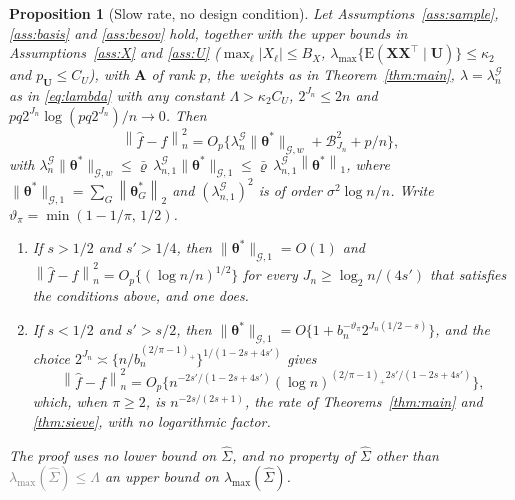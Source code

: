 \documentclass[12pt]{article} %
\newtheorem{proposition}{Proposition}
\theoremstyle{definition}
\theoremstyle{plain}
\newcommand{\E}{\mathrm{E}}
\newcommand{\T}{^{\top}}
\newcommand{\norm}[1]{\left\lVert #1 \right\rVert}
\newcommand{\normn}[1]{\left\lVert #1 \right\rVert_{n}}
\newcommand{\cv}{\ell}
\newcommand{\bX}{\mathbf{X}}
\newcommand{\bU}{\mathbf{U}}
\newcommand{\btheta}{\boldsymbol{\theta}}
\newcommand{\thetastar}{\btheta^{*}}
\newcommand{\Gramhat}{\widehat{\Sigma}}
\newcommand{\pen}{\lambda}
\newcommand{\seff}{s'}
\newcommand{\Amat}{\mathbf{A}}
\newcommand{\lmaxx}{\lambda_{\max}}
\newcommand{\bn}{b_{n}}
\newcommand{\nGw}[1]{\lVert #1\rVert_{\mathcal{G},w}}
\newcommand{\nGone}[1]{\lVert #1\rVert_{\mathcal{G},1}}
\newcommand{\lamG}{\lambda^{\mathcal{G}}_{n}}
\newcommand{\lamGone}{\lambda^{\mathcal{G}}_{n,1}}
\begin{document}
{\color{colR1}
\begin{proposition}[Slow rate, no design condition]
\label{prop:slow}
Let Assumptions~\ref{ass:sample}, \ref{ass:basis} and \ref{ass:besov} hold,
together with the upper bounds in Assumptions~\ref{ass:X} and \ref{ass:U}
($\max_{\cv}|X_{\cv}| \le B_X$, $\lmaxx\{\E(\bX\bX\T\mid\bU)\} \le \kappa_2$ and
$p_{\bU} \le C_U$), with $\Amat$ of rank $p$, the weights as in
Theorem~\ref{thm:main}, $\pen = \lamG$ as in \eqref{eq:lambda} with any constant
$\Lambda > \kappa_2C_U$, $2^{J_n} \le 2n$ and
$pq2^{J_n}\log(pq2^{J_n})/n \to 0$. Then
\[
  \normn{\widehat{f}-f}^{2} = O_p\bigl\{\lamG\nGw{\thetastar} +
  \mathcal{B}_{J_n}^{2} + p/n\bigr\},
\]
with $\lamG\nGw{\thetastar} \le \bar\varrho\,\lamGone\nGone{\thetastar}
\le \bar\varrho\,\lamGone\norm{\thetastar}_{1}$, where $\nGone{\thetastar} = \sum_{G}\norm{\thetastar_{G}}_{2}$ and
$(\lamGone)^{2}$ is of order $\sigma^{2}\log n/n$. Write
$\vartheta_\pi = \min(1-1/\pi,\,1/2)$.
\begin{enumerate}
\item[(i)] If $s > 1/2$ and $\seff > 1/4$, then $\nGone{\thetastar} = O(1)$
and $\normn{\widehat{f}-f}^{2} = O_p\{(\log n/n)^{1/2}\}$ for every
$J_n \ge \log_2 n/(4\seff)$ that satisfies the conditions above, and one
does.
\item[(ii)] If $s < 1/2$ and $\seff > s/2$, then
$\nGone{\thetastar} = O\{1 + \bn^{-\vartheta_\pi}2^{J_n(1/2-s)}\}$, and the
choice $2^{J_n} \asymp \{n/\bn^{(2/\pi-1)_{+}}\}^{1/(1-2s+4\seff)}$ gives
\[
  \normn{\widehat{f}-f}^{2}
  = O_p\bigl\{n^{-2\seff/(1-2s+4\seff)}
  (\log n)^{(2/\pi-1)_{+}2\seff/(1-2s+4\seff)}\bigr\} ,
\]
which, when $\pi \ge 2$, is $n^{-2s/(2s+1)}$, the rate of
Theorems~\ref{thm:main} and \ref{thm:sieve}, with no logarithmic factor.
\end{enumerate}
The proof uses no lower bound on $\Gramhat$, and no property of $\Gramhat$
other than \textcolor{gray}{\sout{$\lmaxx(\Gramhat) \le \Lambda$}} an upper bound on
$\lmaxx(\Gramhat)$.
\end{proposition}
}
\end{document}
